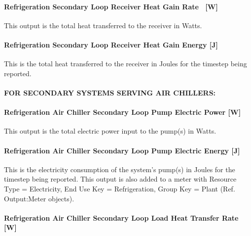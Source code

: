 \paragraph{Refrigeration Secondary Loop Receiver Heat Gain Rate~ {[}W{]}}\label{refrigeration-secondary-loop-receiver-heat-gain-rate-w}

This output is the total heat transferred to the receiver in Watts.

\paragraph{Refrigeration Secondary Loop Receiver Heat Gain Energy {[}J{]}}\label{refrigeration-secondary-loop-receiver-heat-gain-energy-j}

This is the total heat transferred to the receiver in Joules for the timestep being reported.

\paragraph{FOR SECONDARY SYSTEMS SERVING AIR CHILLERS:}\label{for-secondary-systems-serving-air-chillers}

\paragraph{Refrigeration Air Chiller Secondary Loop Pump Electric Power {[}W{]}}\label{refrigeration-air-chiller-secondary-loop-pump-electric-power-w}

This output is the total electric power input to the pump(s) in Watts.

\paragraph{Refrigeration Air Chiller Secondary Loop Pump Electric Energy {[}J{]}}\label{refrigeration-air-chiller-secondary-loop-pump-electric-energy-j}

This is the electricity consumption of the system's pump(s) in Joules for the timestep being reported. This output is also added to a meter with Resource Type = Electricity, End Use Key = Refrigeration, Group Key = Plant (Ref. Output:Meter objects).

\paragraph{Refrigeration Air Chiller Secondary Loop Load Heat Transfer Rate {[}W{]}}\label{refrigeration-air-chiller-secondary-loop-load-heat-transfer-rate-w}

